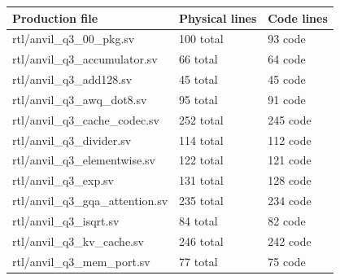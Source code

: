 \documentclass[11pt,a4paper]{article}
\begin{document}
{\small\renewcommand{\arraystretch}{1.18}\begin{longtable}{@{}L{0.55\textwidth}|L{0.18\textwidth}|L{0.18\textwidth}@{}}\toprule

\textbf{Production file} & \textbf{Physical lines} & \textbf{Code lines}\\\midrule\endhead

rtl/\allowbreak{}anvil\_\allowbreak{}q3\_\allowbreak{}00\_\allowbreak{}pkg.sv & 100 total & 93 code\\[2pt]\hline

rtl/\allowbreak{}anvil\_\allowbreak{}q3\_\allowbreak{}accumulator.sv & 66 total & 64 code\\[2pt]\hline

rtl/\allowbreak{}anvil\_\allowbreak{}q3\_\allowbreak{}add128.sv & 45 total & 45 code\\[2pt]\hline

rtl/\allowbreak{}anvil\_\allowbreak{}q3\_\allowbreak{}awq\_\allowbreak{}dot8.sv & 95 total & 91 code\\[2pt]\hline

rtl/\allowbreak{}anvil\_\allowbreak{}q3\_\allowbreak{}cache\_\allowbreak{}codec.sv & 252 total & 245 code\\[2pt]\hline

rtl/\allowbreak{}anvil\_\allowbreak{}q3\_\allowbreak{}divider.sv & 114 total & 112 code\\[2pt]\hline

rtl/\allowbreak{}anvil\_\allowbreak{}q3\_\allowbreak{}elementwise.sv & 122 total & 121 code\\[2pt]\hline

rtl/\allowbreak{}anvil\_\allowbreak{}q3\_\allowbreak{}exp.sv & 131 total & 128 code\\[2pt]\hline

rtl/\allowbreak{}anvil\_\allowbreak{}q3\_\allowbreak{}gqa\_\allowbreak{}attention.sv & 235 total & 234 code\\[2pt]\hline

rtl/\allowbreak{}anvil\_\allowbreak{}q3\_\allowbreak{}isqrt.sv & 84 total & 82 code\\[2pt]\hline

rtl/\allowbreak{}anvil\_\allowbreak{}q3\_\allowbreak{}kv\_\allowbreak{}cache.sv & 246 total & 242 code\\[2pt]\hline

rtl/\allowbreak{}anvil\_\allowbreak{}q3\_\allowbreak{}mem\_\allowbreak{}port.sv & 77 total & 75 code\\[2pt]\hline


\end{longtable}}
\end{document}
